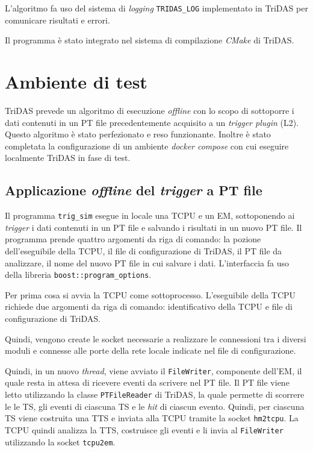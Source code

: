 \documentclass[../main.tex]{subfiles}
\begin{document}
L'algoritmo fa uso del sistema di \emph{logging} \texttt{TRIDAS\_LOG} implementato in TriDAS per comunicare risultati e errori. 

Il programma è stato integrato nel sistema di compilazione \emph{CMake} di TriDAS.
\section{Ambiente di test}
TriDAS prevede un algoritmo di esecuzione \emph{offline} con lo scopo di sottoporre i dati contenuti in un PT file precedentemente acquisito a un \emph{trigger plugin} (L2). Questo algoritmo è stato perfezionato e reso funzionante. Inoltre è stato completata la configurazione di un ambiente \emph{docker compose} con cui eseguire localmente TriDAS in fase di test. 
\subsection{Applicazione \emph{offline} del \emph{trigger} a PT file}
Il programma \texttt{trig\_sim} esegue in locale una TCPU e un EM, sottoponendo ai \emph{trigger} i dati contenuti in un PT file e salvando i risultati in un nuovo PT file.
Il programma prende quattro argomenti da riga di comando: la pozione dell'eseguibile della TCPU, il file di configurazione di TriDAS, il PT file da analizzare, il nome del nuovo PT file in cui salvare i dati. L'interfaccia fa uso della libreria \texttt{boost::program\_options}.

Per prima cosa si avvia la TCPU come sottoprocesso. L'eseguibile della TCPU richiede due argomenti da riga di comando: identificativo della TCPU e file di configurazione di TriDAS.

Quindi, vengono create le socket necessarie a realizzare le connessioni tra i diversi moduli e connesse alle porte della rete locale indicate nel file di configurazione.
%

Quindi, in un nuovo \emph{thread}, viene avviato il \texttt{FileWriter}, componente dell'EM, il quale resta in attesa di ricevere eventi da scrivere nel PT file. 
Il PT file viene letto utilizzando la classe \texttt{PTFileReader} di TriDAS, la quale permette di scorrere le le TS, gli eventi di ciascuna TS e le \emph{hit} di ciascun evento. Quindi, per ciascuna TS viene costruita una TTS e inviata alla TCPU tramite la socket \texttt{hm2tcpu}.
La TCPU quindi analizza la TTS, costruisce gli eventi e li invia al \texttt{FileWriter} utilizzando la socket \texttt{tcpu2em}.
\end{document}
